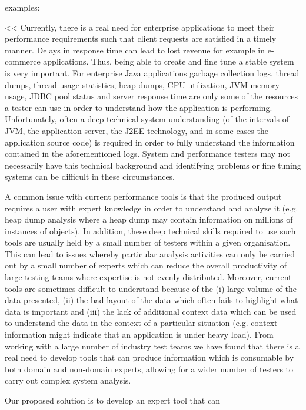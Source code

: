 \documentclass[runningheads,a4paper]{llncs}
\begin{document}
examples:

<<
Currently, there is a real need for enterprise applications to meet their 
performance requirements such that client requests are satisfied in a timely
manner. Delays in response time can lead to lost revenue for example in
e-commerce applications. Thus, being able to create and fine tune a stable
system is very important. For enterprise Java applications garbage collection logs, 
thread dumps, thread usage statistics, heap dumps, CPU utilization, JVM memory usage, 
JDBC pool status and server response time are only some of the resources a tester can use 
in order to understand how the application is performing. Unfortunately, often a deep 
technical system understanding (of the intervals of JVM, the application server, the 
J2EE technology, and in some cases the application source code) is required in order to 
fully understand the information contained in the aforementioned logs. System and 
performance testers may not necessarily have this technical background and identifying 
problems or fine tuning systems can be difficult in these circumstances.

A common issue with current performance tools is that the
produced output requires a user with expert knowledge in order to understand and analyze 
it (e.g. heap dump analysis where a heap dump may contain information on millions of 
instances of objects). In addition, these deep technical skills required to use such 
tools are usually held by a small number of testers within a given organisation. This can 
lead to issues whereby particular analysis activities can only be carried out by a small 
number of experts which can reduce the overall productivity of large testing teams where 
expertise is not evenly distributed. Moreover, current tools are sometimes difficult to 
understand because of the (i) large volume of the data presented, (ii) the bad layout of 
the data which often fails to highlight what data is important and (iii) the lack of 
additional context data which can be used to understand the data in the context of a 
particular situation (e.g. context information might indicate that an application is 
under heavy load). From working with a large number of industry test teams we have found 
that there is a real need to develop tools that can produce information which is 
consumable by both domain and non-domain experts, allowing for a wider number of testers 
to carry out complex system analysis.

Our proposed solution is to develop an expert tool that can
\end{document}
